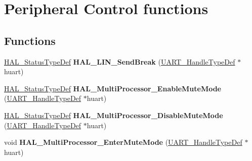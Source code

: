 \hypertarget{group___u_a_r_t___exported___functions___group3}{}\section{Peripheral Control functions}
\label{group___u_a_r_t___exported___functions___group3}
\subsection*{Functions}
\begin{DoxyCompactItemize}
\item 
\mbox{\label{group___u_a_r_t___exported___functions___group3_gaffbf11fb4929f709004a11675cd25fcf}} 
\mbox{\hyperlink{stm32f7xx__hal__def_8h_a63c0679d1cb8b8c684fbb0632743478f}{H\+A\+L\+\_\+\+Status\+Type\+Def}} {\bfseries H\+A\+L\+\_\+\+L\+I\+N\+\_\+\+Send\+Break} (\mbox{\hyperlink{group___u_a_r_t___exported___types_ga7adf4f3e4c3ecde572be5925c915a967}{U\+A\+R\+T\+\_\+\+Handle\+Type\+Def}} $\ast$huart)
\item 
\mbox{\label{group___u_a_r_t___exported___functions___group3_gad1e8ba15af5c8b25fd9eb31b9c85dfac}} 
\mbox{\hyperlink{stm32f7xx__hal__def_8h_a63c0679d1cb8b8c684fbb0632743478f}{H\+A\+L\+\_\+\+Status\+Type\+Def}} {\bfseries H\+A\+L\+\_\+\+Multi\+Processor\+\_\+\+Enable\+Mute\+Mode} (\mbox{\hyperlink{group___u_a_r_t___exported___types_ga7adf4f3e4c3ecde572be5925c915a967}{U\+A\+R\+T\+\_\+\+Handle\+Type\+Def}} $\ast$huart)
\item 
\mbox{\label{group___u_a_r_t___exported___functions___group3_ga60e23409c6c4039dd71a45e41c69654f}} 
\mbox{\hyperlink{stm32f7xx__hal__def_8h_a63c0679d1cb8b8c684fbb0632743478f}{H\+A\+L\+\_\+\+Status\+Type\+Def}} {\bfseries H\+A\+L\+\_\+\+Multi\+Processor\+\_\+\+Disable\+Mute\+Mode} (\mbox{\hyperlink{group___u_a_r_t___exported___types_ga7adf4f3e4c3ecde572be5925c915a967}{U\+A\+R\+T\+\_\+\+Handle\+Type\+Def}} $\ast$huart)
\item 
\mbox{\label{group___u_a_r_t___exported___functions___group3_ga62b7a4ce64c678a3a79d747fe3f50883}} 
void {\bfseries H\+A\+L\+\_\+\+Multi\+Processor\+\_\+\+Enter\+Mute\+Mode} (\mbox{\hyperlink{group___u_a_r_t___exported___types_ga7adf4f3e4c3ecde572be5925c915a967}{U\+A\+R\+T\+\_\+\+Handle\+Type\+Def}} $\ast$huart)

\end{DoxyCompactItemize}
